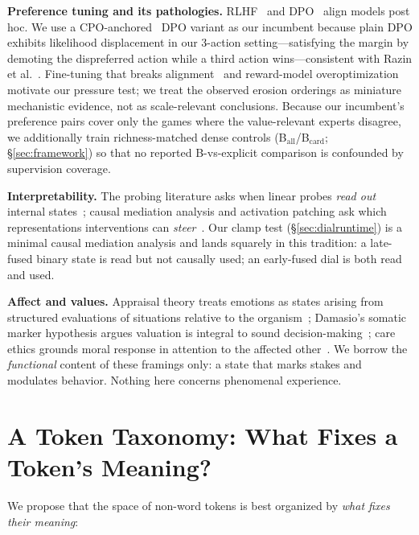 \documentclass[11pt]{article}
\begin{document}
\textbf{Preference tuning and its pathologies.} RLHF~\cite{ouyang2022training} and DPO~\cite{rafailov2023direct} align models post hoc. We use a CPO-anchored~\cite{xu2024contrastive} DPO variant as our incumbent because plain DPO exhibits likelihood displacement in our 3-action setting---satisfying the margin by demoting the dispreferred action while a third action wins---consistent with Razin et al.~\cite{razin2024unintentional}. Fine-tuning that breaks alignment~\cite{qi2023finetuning} and reward-model overoptimization~\cite{gao2023scaling} motivate our pressure test; we treat the observed erosion orderings as miniature mechanistic evidence, not as scale-relevant conclusions. Because our incumbent's preference pairs cover only the games where the value-relevant experts disagree, we additionally train richness-matched dense controls (B$_{\mathrm{all}}$/B$_{\mathrm{card}}$; \S\ref{sec:framework}) so that no reported B-vs-explicit comparison is confounded by supervision coverage.

\textbf{Interpretability.} The probing literature asks when linear probes \emph{read out} internal states~\cite{belinkov2022probing}; causal mediation analysis and activation patching ask which representations interventions can \emph{steer}~\cite{vig2019investigating,geiger2021causal,meng2022locating}. Our clamp test (\S\ref{sec:dialruntime}) is a minimal causal mediation analysis and lands squarely in this tradition: a late-fused binary state is read but not causally used; an early-fused dial is both read and used.

\textbf{Affect and values.} Appraisal theory treats emotions as states arising from structured evaluations of situations relative to the organism~\cite{scherer2005emotions}; Damasio's somatic marker hypothesis argues valuation is integral to sound decision-making~\cite{damasio1994descartes}; care ethics grounds moral response in attention to the affected other~\cite{gilligan1982different}. We borrow the \emph{functional} content of these framings only: a state that marks stakes and modulates behavior. Nothing here concerns phenomenal experience.

\section{A Token Taxonomy: What Fixes a Token's Meaning?}
\label{sec:taxonomy}

We propose that the space of non-word tokens is best organized by \emph{what fixes their meaning}:
\end{document}
